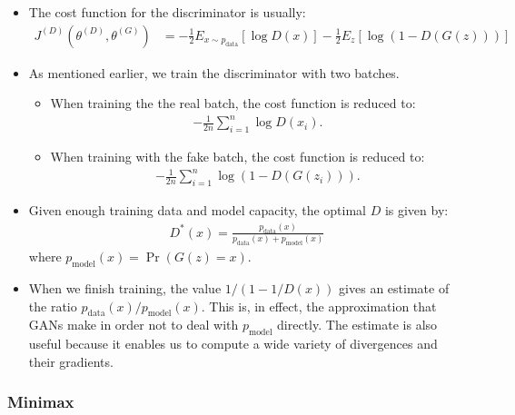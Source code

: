 \documentclass[10pt]{article}
\begin{document}
  \begin{itemize}
    \item The cost function for the discriminator is usually:
    \begin{align*}
      J^{(D)}(\theta^{(D)},\theta^{(G)}) 
      &= -\frac{1}{2} E_{x \sim p_{\mathrm{data}}} [\log D(x)] - \frac{1}{2} E_z [\log(1 - D(G(z)))]
    \end{align*}

    \item As mentioned earlier, we train the discriminator with two batches.
    \begin{itemize}
      \item When training the the real batch, the cost function is reduced to:
      \begin{align*}
        -\frac{1}{2n} \sum_{i=1}^n \log D(x_i).
      \end{align*}

      \item When training with the fake batch, the cost function is reduced to:
      \begin{align*}
        -\frac{1}{2n} \sum_{i=1}^n \log (1 - D(G(z_i))).
      \end{align*}
    \end{itemize}

    \item Given enough training data and model capacity, the optimal $D$ is given by:
    \begin{align*}
      D^*(x) = \frac{p_{\mathrm{data}}(x)}{p_{\mathrm{data}}(x) + p_{\mathrm{model}}(x)}
    \end{align*}
    where $p_{\mathrm{model}}(x) = \Pr(G(z) = x)$.

    \item When we finish training, the value $1/(1-1/D(x))$ gives an estimate of the ratio $p_{\mathrm{data}}(x) / p_{\mathrm{model}}(x)$. This is, in effect, the approximation that GANs make in order not to deal with $p_{\mathrm{model}}$ directly. The estimate is also useful because it enables us to compute a wide variety of divergences and their gradients.
  \end{itemize}

  \subsubsection{Minimax}
\end{document}

